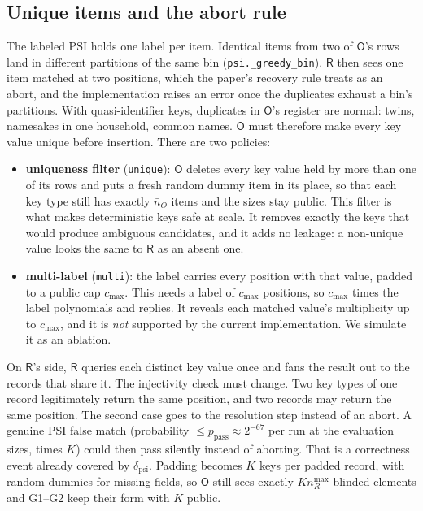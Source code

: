 \documentclass[10pt]{article}
\newcommand{\Rp}{\mathsf{R}}
\newcommand{\Op}{\mathsf{O}}
\begin{document}
\subsection{Unique items and the abort rule}
The labeled PSI holds one label per item. Identical items from two of $\Op$'s rows land in different partitions of the same bin (\texttt{psi.\_greedy\_bin}). $\Rp$ then sees one item matched at two positions, which the paper's recovery rule treats as an abort, and the implementation raises an error once the duplicates exhaust a bin's partitions. With quasi-identifier keys, duplicates in $\Op$'s register are normal: twins, namesakes in one household, common names. $\Op$ must therefore make every key value unique before insertion. There are two policies:
\begin{itemize}
\item \textbf{uniqueness filter} (\texttt{unique}): $\Op$ deletes every key value held by more than one of its rows and puts a fresh random dummy item in its place, so that each key type still has exactly $\bar n_O$ items and the sizes stay public. This filter is what makes deterministic keys safe at scale. It removes exactly the keys that would produce ambiguous candidates, and it adds no leakage: a non-unique value looks the same to $\Rp$ as an absent one.
\item \textbf{multi-label} (\texttt{multi}): the label carries every position with that value, padded to a public cap $c_{\max}$. This needs a label of $c_{\max}$ positions, so $c_{\max}$ times the label polynomials and replies. It reveals each matched value's multiplicity up to $c_{\max}$, and it is \emph{not} supported by the current implementation. We simulate it as an ablation.
\end{itemize}
On $\Rp$'s side, $\Rp$ queries each distinct key value once and fans the result out to the records that share it. The injectivity check must change. Two key types of one record legitimately return the same position, and two records may return the same position. The second case goes to the resolution step instead of an abort. A genuine PSI false match (probability $\le p_{\mathrm{pass}}\approx2^{-67}$ per run at the evaluation sizes, times $K$) could then pass silently instead of aborting. That is a correctness event already covered by $\delta_{\mathrm{psi}}$. Padding becomes $K$ keys per padded record, with random dummies for missing fields, so $\Op$ still sees exactly $K n_R^{\max}$ blinded elements and G1--G2 keep their form with $K$ public.
\end{document}
